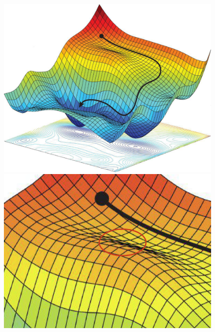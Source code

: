 \begin{figure}[ht]
  \begin{minipage}[t]{0.48\textwidth}
    \centering
    \includegraphics[width=\textwidth]{asset/20230902174547.png}
    \caption{}
    \label{fig:img13_4}
  \end{minipage} %
  \hspace{1em}
  \begin{minipage}[t]{0.48\textwidth}
    \centering
    \includegraphics[width=\textwidth]{asset/20230902174840.png}
    \caption{}
    \label{fig:img13_5}
  \end{minipage}
\end{figure}

